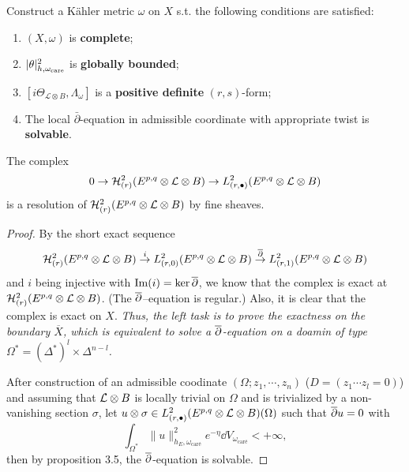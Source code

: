 \documentclass[lang=en,12pt]{beautybook}
\begin{document}
\begin{fancybox}
  \begin{center}
  \end{center}
Construct a K\"ahler metric $\omega$ on $X$ s.t. the following conditions
are satisfied:
\begin{enumerate}
  \item $(X, \omega)$ is \textbf{complete};
  
  \item $| \theta |^2_{h, \omega_{\operatorname{care}}} $ is \textbf{globally bounded};
  
  \item $[i \Theta_{\mathcal{L} \otimes B}, \Lambda_{\omega}]$ is a \textbf{positive
  definite} $(r, s)$-form;
  
  \item The local $\bar{\partial}$-equation in admissible coordinate with
  appropriate twist is \textbf{solvable}.
\end{enumerate}
\end{fancybox}

\begin{proposition}
  The complex \begin{align*}
    0\to{\mathcal H}^2_{(r)}(E^{p,q}\otimes{\mathcal L}\otimes B)\to L^2_{(r,\bullet)}(E^{p,q}\otimes{\mathcal L}\otimes B)
  \end{align*}
    is a resolution of ${\mathcal H}^2_{(r)}(E^{p,q}\otimes{\mathcal L}\otimes B)$ by fine sheaves.
\end{proposition}
  \begin{proof}
    By the short exact sequence \begin{align*}
      {\mathcal H}^2_{(r)}(E^{p,q}\otimes{\mathcal L}\otimes B) \stackrel{i}{\rightarrow} L^2_{(r,0)}(E^{p,q}\otimes{\mathcal L}\otimes B)\stackrel{\overline{\partial}}{\rightarrow} L^2_{(r,1)}(E^{p,q}\otimes{\mathcal L}\otimes B)
    \end{align*} and $i$ being injective with $\operatorname{Im}(i)=\ker \overline{\partial}$, we know that the complex is exact at ${\mathcal H}^2_{(r)}(E^{p,q}\otimes{\mathcal L}\otimes B)$. (The $\overline{\partial}$--equation is regular.) Also, it is clear that the complex is exact on $X$. \emph{Thus, the left task is to prove the exactness on the boundary $\overline{X}$, which is equivalent to solve a $\overline{\partial}$-equation on a doamin of type $\Omega^*=(\Delta^*)^l\times \Delta^{n-l}$.}
      
    After construction of an admissible coodinate $(\Omega;z_1,\cdots,z_n)$ ($D=(z_1\cdots z_l=0)$) and assuming that ${\mathcal L}\otimes B$ is locally trivial on $\Omega$ and is trivialized by a non-vanishing section $\sigma$, let $u\otimes \sigma\in L^2_{(r,\bullet)}(E^{p,q}\otimes{\mathcal L}\otimes B)(\Omega)$ such that $\overline{\partial} u=0$ with 
    \[
      \int_{\Omega^*}\| u\|^2_{h_E,\omega_{\text{car\'e}}}e^{-\eta}\dd V_{\omega_{\text{car\'e}}}<+\infty,
    \] 
    then by proposition 3.5, the $\overline{\partial}$-equation is solvable.
  \end{proof}
\end{document}
